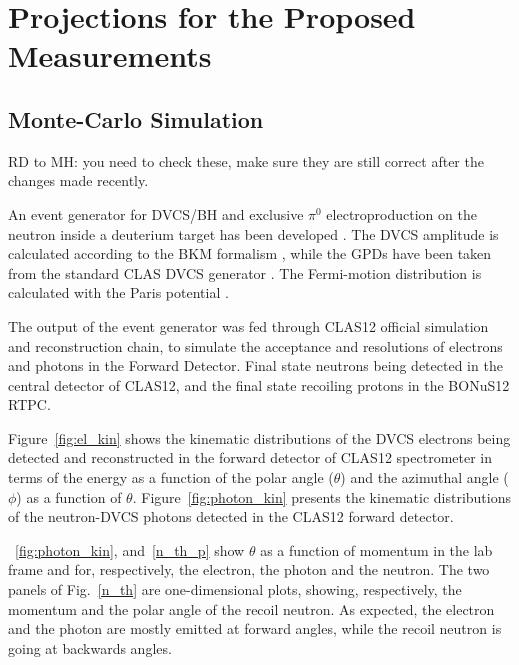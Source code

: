 \chapter{Projections for the Proposed Measurements}
\label{chap:reach}

\section{Monte-Carlo Simulation}
RD to MH: you need to check these, make sure they are still correct after the changes made recently.

An event generator for DVCS/BH and exclusive $\pi^0$ electroproduction on the 
neutron inside a deuterium target has been developed \cite{ahmed}. The DVCS 
amplitude is calculated according to the BKM formalism \cite{Belitsky:2001ns}, 
while the GPDs have been taken from the standard CLAS DVCS generator 
\cite{PhysRevD.60.094017,Guidal:2004nd}.  The Fermi-motion distribution is 
calculated with the Paris potential \cite{PhysRevC.21.861}.

The output of the event generator was fed through CLAS12 official simulation 
and reconstruction chain, to simulate the acceptance and resolutions of 
electrons and photons in the Forward Detector. Final state neutrons being 
detected in the central detector of CLAS12, and the final state recoiling 
protons in the BONuS12 RTPC. 

Figure~\ref{fig:el_kin} shows the kinematic distributions of the DVCS electrons 
being detected and reconstructed in the forward detector of CLAS12 spectrometer 
in terms of the energy as a function of the polar angle ($\theta$) and the 
azimuthal angle ($\phi$) as a function of $\theta$. Figure~\ref{fig:photon_kin} 
presents the kinematic distributions of the neutron-DVCS photons detected in 
the CLAS12 forward detector.



~\ref{fig:photon_kin}, and~\ref{n_th_p} show $\theta$ as a function of momentum 
in the lab frame and for, respectively, the electron, the photon and the 
neutron.  The two panels of Fig.~\ref{n_th} are one-dimensional plots, showing, 
respectively, the momentum and the polar angle of the recoil neutron.  As 
expected, the electron and the photon are mostly emitted at forward angles, 
while the recoil neutron is going at backwards angles.

